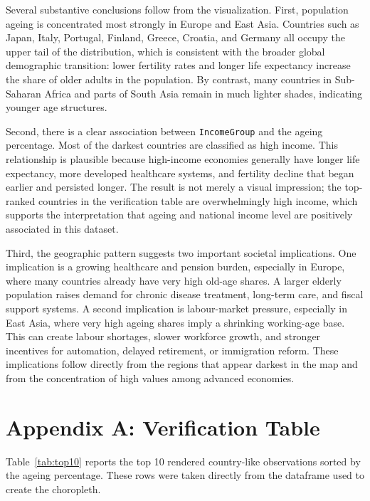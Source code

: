 \documentclass[11pt]{article}
\begin{document}
Several substantive conclusions follow from the visualization. First, population ageing is concentrated most strongly in Europe and East Asia. Countries such as Japan, Italy, Portugal, Finland, Greece, Croatia, and Germany all occupy the upper tail of the distribution, which is consistent with the broader global demographic transition: lower fertility rates and longer life expectancy increase the share of older adults in the population. By contrast, many countries in Sub-Saharan Africa and parts of South Asia remain in much lighter shades, indicating younger age structures.

Second, there is a clear association between \texttt{IncomeGroup} and the ageing percentage. Most of the darkest countries are classified as high income. This relationship is plausible because high-income economies generally have longer life expectancy, more developed healthcare systems, and fertility decline that began earlier and persisted longer. The result is not merely a visual impression; the top-ranked countries in the verification table are overwhelmingly high income, which supports the interpretation that ageing and national income level are positively associated in this dataset.

Third, the geographic pattern suggests two important societal implications. One implication is a growing healthcare and pension burden, especially in Europe, where many countries already have very high old-age shares. A larger elderly population raises demand for chronic disease treatment, long-term care, and fiscal support systems. A second implication is labour-market pressure, especially in East Asia, where very high ageing shares imply a shrinking working-age base. This can create labour shortages, slower workforce growth, and stronger incentives for automation, delayed retirement, or immigration reform. These implications follow directly from the regions that appear darkest in the map and from the concentration of high values among advanced economies.

\appendix

\section*{Appendix A: Verification Table}

Table~\ref{tab:top10} reports the top 10 rendered country-like observations sorted by the ageing percentage. These rows were taken directly from the dataframe used to create the choropleth.
\end{document}
